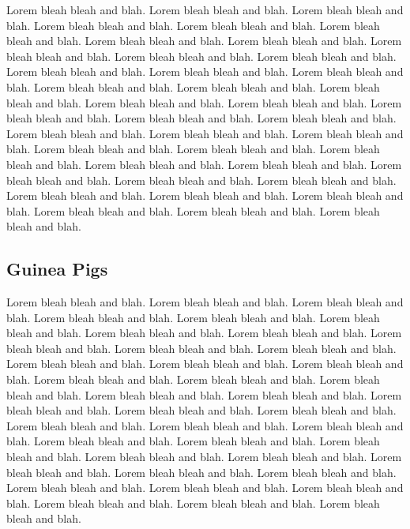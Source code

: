 \documentclass[letterpaper,10pt]{article}
\begin{document}
Lorem bleah bleah and blah. Lorem bleah bleah and blah. Lorem bleah
bleah and blah. Lorem bleah bleah and blah. Lorem bleah bleah and
blah. Lorem bleah bleah and blah. Lorem bleah bleah and blah. Lorem
bleah bleah and blah. Lorem bleah bleah and blah. Lorem bleah bleah
and blah. Lorem bleah bleah and blah. Lorem bleah bleah and blah.
Lorem bleah bleah and blah. Lorem bleah bleah and blah. Lorem bleah
bleah and blah. Lorem bleah bleah and blah. Lorem bleah bleah and
blah. Lorem bleah bleah and blah. Lorem bleah bleah and blah. Lorem
bleah bleah and blah. Lorem bleah bleah and blah. Lorem bleah bleah
and blah. Lorem bleah bleah and blah. Lorem bleah bleah and blah.
Lorem bleah bleah and blah. Lorem bleah bleah and blah. Lorem bleah
bleah and blah. Lorem bleah bleah and blah. Lorem bleah bleah and
blah. Lorem bleah bleah and blah. Lorem bleah bleah and blah. Lorem
bleah bleah and blah. Lorem bleah bleah and blah. Lorem bleah bleah
and blah. Lorem bleah bleah and blah. Lorem bleah bleah and blah.
Lorem bleah bleah and blah. Lorem bleah bleah and blah. Lorem bleah
bleah and blah.

\subsection {Guinea Pigs}

Lorem bleah bleah and blah. Lorem bleah bleah and blah. Lorem bleah
bleah and blah. Lorem bleah bleah and blah. Lorem bleah bleah and
blah. Lorem bleah bleah and blah. Lorem bleah bleah and blah. Lorem
bleah bleah and blah. Lorem bleah bleah and blah. Lorem bleah bleah
and blah. Lorem bleah bleah and blah. Lorem bleah bleah and blah.
Lorem bleah bleah and blah. Lorem bleah bleah and blah. Lorem bleah
bleah and blah. Lorem bleah bleah and blah. Lorem bleah bleah and
blah. Lorem bleah bleah and blah. Lorem bleah bleah and blah. Lorem
bleah bleah and blah. Lorem bleah bleah and blah. Lorem bleah bleah
and blah. Lorem bleah bleah and blah. Lorem bleah bleah and blah.
Lorem bleah bleah and blah. Lorem bleah bleah and blah. Lorem bleah
bleah and blah. Lorem bleah bleah and blah. Lorem bleah bleah and
blah. Lorem bleah bleah and blah. Lorem bleah bleah and blah. Lorem
bleah bleah and blah. Lorem bleah bleah and blah. Lorem bleah bleah
and blah. Lorem bleah bleah and blah. Lorem bleah bleah and blah.
Lorem bleah bleah and blah. Lorem bleah bleah and blah. Lorem bleah
bleah and blah.
\end{document}
